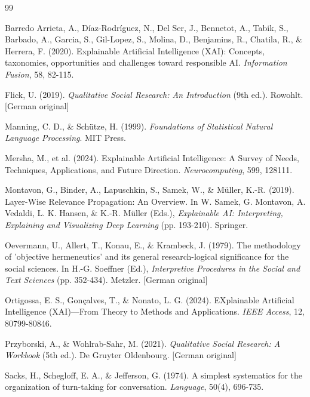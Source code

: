 \documentclass[
  12pt,
  a4paper,
  oneside,
  titlepage
]{article}
\begin{document}
\newpage
\begin{thebibliography}{99}

Barredo Arrieta, A., Díaz-Rodríguez, N., Del Ser, J., Bennetot, A., Tabik, S., 
Barbado, A., Garcia, S., Gil-Lopez, S., Molina, D., Benjamins, R., Chatila, R., 
\& Herrera, F. (2020). Explainable Artificial Intelligence (XAI): Concepts, 
taxonomies, opportunities and challenges toward responsible AI. 
\textit{Information Fusion}, 58, 82-115.

Flick, U. (2019). \textit{Qualitative Social Research: An Introduction} 
(9th ed.). Rowohlt. [German original]

Manning, C. D., \& Schütze, H. (1999). \textit{Foundations of Statistical Natural 
Language Processing}. MIT Press.

Mersha, M., et al. (2024). Explainable Artificial Intelligence: A Survey of Needs, 
Techniques, Applications, and Future Direction. \textit{Neurocomputing}, 599, 128111.

Montavon, G., Binder, A., Lapuschkin, S., Samek, W., \& Müller, K.-R. (2019). 
Layer-Wise Relevance Propagation: An Overview. In W. Samek, G. Montavon, 
A. Vedaldi, L. K. Hansen, \& K.-R. Müller (Eds.), \textit{Explainable AI: 
Interpreting, Explaining and Visualizing Deep Learning} (pp. 193-210). Springer.

Oevermann, U., Allert, T., Konau, E., \& Krambeck, J. (1979). The methodology 
of 'objective hermeneutics' and its general research-logical significance for 
the social sciences. In H.-G. Soeffner (Ed.), \textit{Interpretive Procedures 
in the Social and Text Sciences} (pp. 352-434). Metzler. [German original]

Ortigossa, E. S., Gonçalves, T., \& Nonato, L. G. (2024). EXplainable Artificial 
Intelligence (XAI)—From Theory to Methods and Applications. \textit{IEEE Access}, 
12, 80799-80846.

Przyborski, A., \& Wohlrab-Sahr, M. (2021). \textit{Qualitative Social Research: 
A Workbook} (5th ed.). De Gruyter Oldenbourg. [German original]

Sacks, H., Schegloff, E. A., \& Jefferson, G. (1974). A simplest systematics for 
the organization of turn-taking for conversation. \textit{Language}, 50(4), 696-735.


\end{thebibliography}
\end{document}
